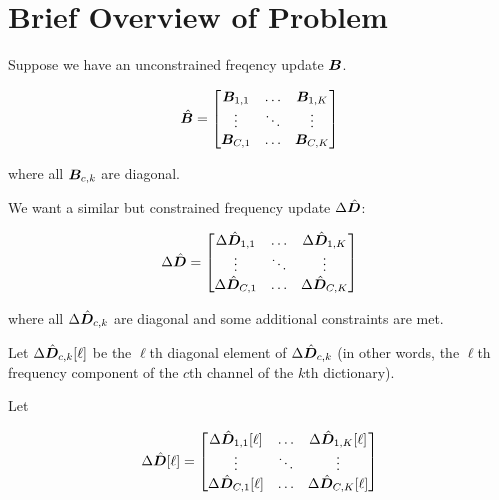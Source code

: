 \documentclass{article}
\begin{document}
\section{Brief Overview of Problem}

Suppose we have an unconstrained freqency update $\bm{B}$.

\begin{equation}
\hat{\bm{B}} = \begin{bmatrix} \bm{B}_{1,1} & \hdots & \bm{B}_{1,K} \\
                            \vdots    & \ddots & \vdots    \\
                            \bm{B}_{C,1} & \hdots & \bm{B}_{C,K}
                   \end{bmatrix}
\end{equation}

where all $\bm{B}_{c, k}$ are diagonal.

We want a similar but constrained frequency update $\Delta \hat{\bm{D}}$:

\begin{equation}
\Delta \hat{\bm{D}} = \begin{bmatrix} \Delta \hat{\bm{D}}_{1,1} & \hdots & \Delta \hat{\bm{D}}_{1,K}\\
                                   \vdots & \ddots & \vdots \\
                                   \Delta \hat{\bm{D}}_{C,1} & \hdots & \Delta \hat{\bm{D}}_{C,K}
                   \end{bmatrix}
\end{equation}


where all $\Delta \hat{\bm{D}}_{c, k}$ are diagonal and some additional constraints are met.

Let $\Delta \hat{\bm{D}}_{c, k}[\ell]$ be the $\ell$th diagonal element of $\Delta \hat{\bm{D}}_{c,k}$ (in other words, the $\ell$th frequency component of the $c$th channel of the $k$th dictionary).

Let


\begin{equation}
\Delta \hat{\bm{D}}[\ell] = \begin{bmatrix}
                                   \Delta \hat{\bm{D}}_{1,1}[\ell] & \hdots & \Delta \hat{\bm{D}}_{1,K}[\ell] \\
                                              \vdots            & \ddots &           \vdots             \\
                                   \Delta \hat{\bm{D}}_{C,1}[\ell] & \hdots & \Delta \hat{\bm{D}}_{C,K}[\ell]
                         \end{bmatrix}
\end{equation}
\end{document}
